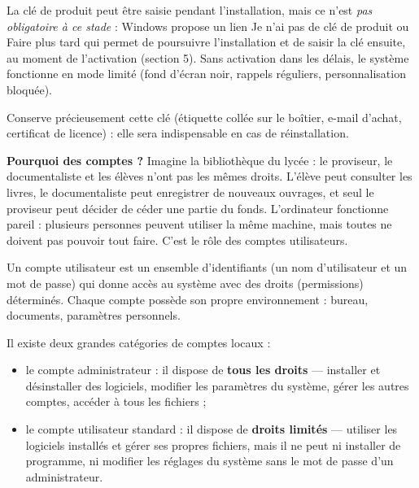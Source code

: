 \documentclass[11pt]{article}
\newcommand{\cle}[1]{{\popxbold\color{popdark}#1}}
\newcounter{popsec}
\newcounter{popsub}
\newcommand{\courssub}[1]{%
  \stepcounter{popsub}%
  \par\vspace{9pt}\noindent{\popxbold\fontsize{11.5}{13}\selectfont\color{popink}{\color{poporange}\thepopsec.\thepopsub}\hspace{6pt}#1}\par\nopagebreak\vspace{4pt}
}
\begin{document}
\begin{propriete}
La clé de produit peut être saisie pendant l'installation, mais ce n'est \emph{pas obligatoire à ce stade} : Windows propose un lien \og Je n'ai pas de clé de produit \fg{} ou \og Faire plus tard \fg{} qui permet de poursuivre l'installation et de saisir la clé ensuite, au moment de l'\cle{activation} (section 5). Sans activation dans les délais, le système fonctionne en mode limité (fond d'écran noir, rappels réguliers, personnalisation bloquée).
\end{propriete}

Conserve précieusement cette clé (étiquette collée sur le boîtier, e-mail d'achat, certificat de licence) : elle sera indispensable en cas de réinstallation.

\courssub{Les comptes utilisateurs}

\textbf{Pourquoi des comptes ?} Imagine la bibliothèque du lycée : le proviseur, le documentaliste et les élèves n'ont pas les mêmes droits. L'élève peut consulter les livres, le documentaliste peut enregistrer de nouveaux ouvrages, et seul le proviseur peut décider de céder une partie du fonds. L'ordinateur fonctionne pareil : plusieurs personnes peuvent utiliser la même machine, mais toutes ne doivent pas pouvoir tout faire. C'est le rôle des \cle{comptes utilisateurs}.

\begin{definition}
Un \cle{compte utilisateur} est un ensemble d'identifiants (un \cle{nom d'utilisateur} et un \cle{mot de passe}) qui donne accès au système avec des \cle{droits} (permissions) déterminés. Chaque compte possède son propre environnement : bureau, documents, paramètres personnels.
\end{definition}

\begin{propriete}
Il existe deux grandes catégories de comptes locaux :
\begin{itemize}
  \item le compte \cle{administrateur} : il dispose de \textbf{tous les droits} — installer et désinstaller des logiciels, modifier les paramètres du système, gérer les autres comptes, accéder à tous les fichiers ;
  \item le compte \cle{utilisateur standard} : il dispose de \textbf{droits limités} — utiliser les logiciels installés et gérer ses propres fichiers, mais il ne peut ni installer de programme, ni modifier les réglages du système sans le mot de passe d'un administrateur.
\end{itemize}
\end{propriete}
\end{document}
